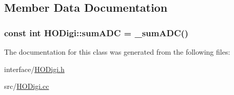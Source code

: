 \subsection{Member Data Documentation}
\hypertarget{class_h_o_digi_a72bdb21836d4e7dba0ad92f50cc652ab}{}
\subsubsection[{sum\+A\+D\+C}]{\setlength{\rightskip}{0pt plus 5cm}const int H\+O\+Digi\+::sum\+A\+D\+C = \+\_\+sum\+A\+D\+C()}\label{class_h_o_digi_a72bdb21836d4e7dba0ad92f50cc652ab}


The documentation for this class was generated from the following files\+:\begin{DoxyCompactItemize}
\item 
interface/\hyperlink{_h_o_digi_8h}{H\+O\+Digi.\+h}\item 
src/\hyperlink{_h_o_digi_8cc}{H\+O\+Digi.\+cc}\end{DoxyCompactItemize}
